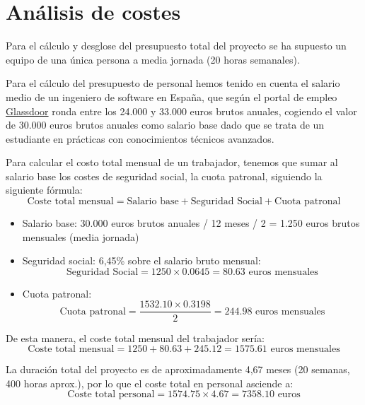 \section{Análisis de costes}
\label{sec:presupuesto}
Para el cálculo y desglose del presupuesto total del proyecto se ha supuesto un equipo de una única persona a media jornada (20 horas semanales).

Para el cálculo del presupuesto de personal hemos tenido en cuenta el salario medio de un ingeniero de software en España, que según el portal de empleo \href{https://www.glassdoor.es/Sueldos/granada-software-engineer-sueldo-SRCH_IL.0,7_IC2614045_KO8,25.htm}{Glassdoor} ronda entre los 24.000 y 33.000 euros brutos anuales, cogiendo el valor de 30.000 euros brutos anuales como salario base dado que se trata de un estudiante en prácticas con conocimientos técnicos avanzados.

Para calcular el costo total mensual de un trabajador, tenemos que sumar al salario base los costes de seguridad social, la cuota patronal, siguiendo la siguiente fórmula:
\begin{equation}
    \text{Coste total mensual} = \text{Salario base} + \text{Seguridad Social} + \text{Cuota patronal}
\end{equation}
\begin{itemize}
    \item Salario base: 30.000 euros brutos anuales / 12 meses / 2 = 1.250 euros brutos mensuales (media jornada)
    \item Seguridad social: 6,45\% sobre el salario bruto mensual:
        \begin{equation}
            \text{Seguridad Social} = 1250 \times 0.0645 = 80.63 \text{ euros mensuales}
        \end{equation}
    \item Cuota patronal: 
        \begin{equation}
            \text{Cuota patronal} = \dfrac{1532.10 \times 0.3198}{2} = 244.98 \text{ euros mensuales}
        \end{equation}
\end{itemize}

De esta manera, el coste total mensual del trabajador sería:
\begin{equation}
    \text{Coste total mensual} = 1250 + 80.63 + 245.12 = 1575.61 \text{ euros mensuales}
\end{equation}

La duración total del proyecto es de aproximadamente 4,67 meses (20 semanas, 400 horas aprox.), por lo que el coste total en personal asciende a:
\begin{equation}
    \text{Coste total personal} = 1574.75 \times 4.67 = 7358.10 \text{ euros}
\end{equation}


